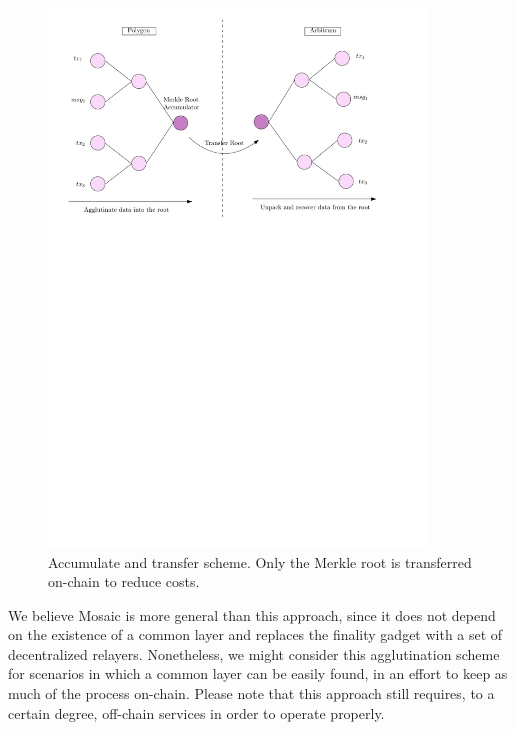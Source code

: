 \begin{figure}[H]
    \centering
    \includegraphics[width=0.9\textwidth]{images/mosaic/phase3/accumulator.pdf}
    \caption{Accumulate and transfer scheme. Only the Merkle root is transferred on-chain to  reduce costs.}
    \label{fig:accumulator}
\end{figure}

We believe Mosaic is more general than this approach, since it does not depend on the existence of a common layer and replaces the finality gadget with a set of decentralized relayers. Nonetheless, we might consider this agglutination scheme for scenarios in which a common layer can be easily found, in an effort to keep as much of the process on-chain. Please note that this approach still requires, to a certain degree, off-chain services in order to operate properly.